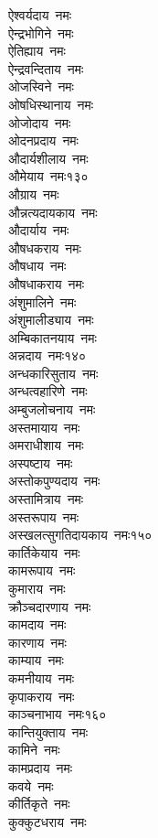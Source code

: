 \begin{multicols}{\maxColumns}
\begin{flushleft}
ऐश्वर्यदाय~नमः\\
ऐन्द्रभोगिने~नमः\\
ऐतिह्याय~नमः\\
ऐन्द्रवन्दिताय~नमः\\
ओजस्विने~नमः\\
ओषधिस्थानाय~नमः\\
ओजोदाय~नमः\\
ओदनप्रदाय~नमः\\
औदार्यशीलाय~नमः\\
औमेयाय~नमः\hfill १३०\\
औग्राय~नमः\\
औन्नत्यदायकाय~नमः\\
औदार्याय~नमः\\
औषधकराय~नमः\\
औषधाय~नमः\\
औषधाकराय~नमः\\
अंशुमालिने~नमः\\
अंशुमालीड्याय~नमः\\
अम्बिकातनयाय~नमः\\
अन्नदाय~नमः\hfill १४०\\
अन्धकारिसुताय~नमः\\
अन्धत्वहारिणे~नमः\\
अम्बुजलोचनाय~नमः\\
अस्तमायाय~नमः\\
अमराधीशाय~नमः\\
अस्पष्टाय~नमः\\
अस्तोकपुण्यदाय~नमः\\
अस्तामित्राय~नमः\\
अस्तरूपाय~नमः\\
अस्खलत्सुगतिदायकाय~नमः\hfill १५०\\
कार्तिकेयाय~नमः\\
कामरूपाय~नमः\\
कुमाराय~नमः\\
क्रौञ्चदारणाय~नमः\\
कामदाय~नमः\\
कारणाय~नमः\\
काम्याय~नमः\\
कमनीयाय~नमः\\
कृपाकराय~नमः\\
काञ्चनाभाय~नमः\hfill १६०\\
कान्तियुक्ताय~नमः\\
कामिने~नमः\\
कामप्रदाय~नमः\\
कवये~नमः\\
कीर्तिकृते~नमः\\
कुक्कुटधराय~नमः\\

\end{flushleft}
\end{multicols}
